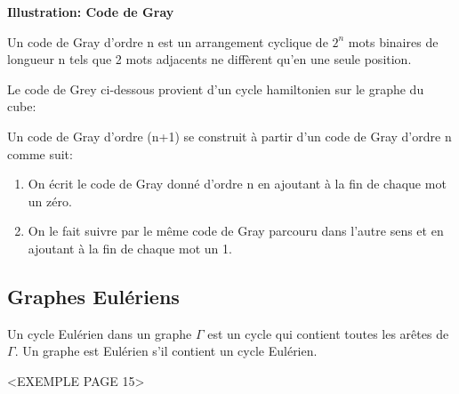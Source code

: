 \newpage

\textbf{Illustration: Code de Gray}

Un code de Gray d'ordre n est un arrangement cyclique de $2^{n}$ mots binaires de longueur n tels que 2 mots adjacents ne diffèrent qu'en une seule position.\\

\begin{exmp}
Le code de Grey ci-dessous provient d'un cycle hamiltonien sur le graphe du cube:\\
\end{exmp}

\begin{figure}[!tbph]
  \centering
  \begin{minipage}[b]{0.4\textwidth}
    
  \end{minipage}
  \hfill
  \begin{minipage}[b]{0.4\textwidth}
    
  \end{minipage}
\end{figure}

Un code de Gray d'ordre (n+1) se construit à partir d'un code de Gray d'ordre n comme suit:

\begin{enumerate}
	\item On écrit le code de Gray donné d'ordre n en ajoutant à la fin de chaque mot un zéro.
	\item On le fait suivre par le même code de Gray parcouru dans l'autre sens et en ajoutant à la fin de chaque mot un 1.
\end{enumerate}


\newpage

\subsection{Graphes Eulériens}

\begin{defn}
Un cycle Eulérien dans un graphe $\Gamma$ est un cycle qui contient toutes les arêtes de $\Gamma$.
Un graphe est Eulérien s'il contient un cycle Eulérien.\\
\end{defn}

\begin{exmp}
<EXEMPLE PAGE 15>\\
\end{exmp}

